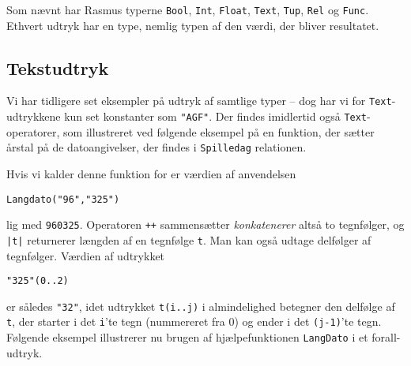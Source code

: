 Som n\ae{}vnt har {\sc Rasmus} typerne
\verb"Bool", \verb"Int", \verb"Float", \verb"Text", \verb"Tup", \verb"Rel" og \verb"Func".
Ethvert udtryk har en type, nemlig typen af den v\ae{}rdi, der
bliver resultatet. 

\subsection{Tekstudtryk}
Vi har tidligere set eksempler p\aa{} udtryk af samtlige typer
-- dog har vi for \verb"Text"-udtrykkene kun set konstanter som \verb$"AGF"$.
Der findes imid\-lertid ogs\aa{} \verb"Text"-operatorer, som illustreret ved
f\o{}lgende eksempel p\aa{} en funktion, der s\ae{}tter \aa{}rstal
p\aa{} de datoangivelser, der findes i \verb"Spilledag" relationen.


Hvis vi kalder denne funktion for  er
v\ae{}rdien af anvendelsen
\begin{center}
\verb$Langdato("96","325")$
\end{center}
lig med \verb"960325". Operatoren \verb"++" sammens\ae{}tter 
{\em konkatenerer\/} alts\aa{}
to tegnf\o{}lger, og \verb"|t|" returnerer l\ae{}ngden af en tegnf\o{}lge
\verb"t". Man kan ogs\aa{} udtage delf\o{}lger af tegnf\o{}lger. V\ae{}rdien
af udtrykket 
\begin{center}
\verb$"325"(0..2)$
\end{center}
er s\aa{}ledes \verb$"32"$, idet udtrykket \verb"t(i..j)" i almindelighed
betegner den delf\o{}lge af \verb"t", der starter i det \verb"i"'te tegn
(nummereret fra 0) og ender i det \verb"(j-1)"'te tegn. F\o{}lgende
eksempel illustrerer nu brugen af hj\ae{}lpefunktionen \verb"LangDato"
i et forall-udtryk.

